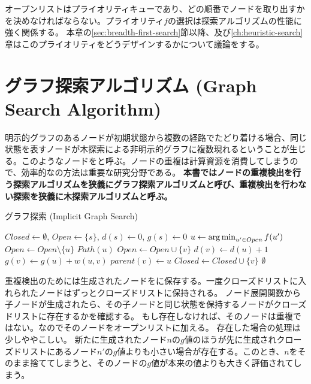 オープンリストはプライオリティキューであり、どの順番でノードを取り出すかを決めなければならない。プライオリティ$f$の選択は探索アルゴリズムの性能に強く関係する。
本章の\ref{sec:breadth-first-search}節以降、及び\ref{ch:heuristic-search}章はこのプライオリティをどうデザインするかについて議論をする。



\section{グラフ探索アルゴリズム (Graph Search Algorithm)}
\label{sec:graph-search-algorithm}


明示的グラフのあるノードが初期状態から複数の経路でたどり着ける場合、同じ状態を表すノードが木探索による非明示的グラフに複数現れるということが生じる。このようなノードをと呼ぶ。ノードの重複は計算資源を消費してしまうので、効率的なの方法は重要な研究分野である。
{\bf 本書ではノードの重複検出を行う探索アルゴリズムを狭義にグラフ探索アルゴリズムと呼び、重複検出を行わない探索を狭義に木探索アルゴリズムと呼ぶ。}


\begin{algorithm}[tbh]
\caption{グラフ探索 (Implicit Graph Search)}
\label{alg:implicit-graph-search}
	$Closed \leftarrow \emptyset$, $Open \leftarrow \{s\}$, $d(s) \leftarrow 0$, $g(s) \leftarrow 0$\;
	 {
                $u \leftarrow \operatorname*{arg\,min}_{u' \in Open} f(u')$ \;
		$Open \leftarrow Open \setminus \{u\} $\;
		 {
			\Return $Path(u)$\;
		}
		 {
		   {
                    $Open \leftarrow Open \cup \{v\}$\;
		    $d(v) \leftarrow d(u) + 1$\;
		    $g(v) \leftarrow g(u) + w(u, v)$\;
                    $parent(v) \leftarrow u$\;
                  }
		   {
                    $Closed \leftarrow Closed \cup \{v\}$\;
                  }
		}
 	}
	\Return $\emptyset$\;
\end{algorithm}


重複検出のためには生成されたノードをに保存する。一度クローズドリストに入れられたノードはずっとクローズドリストに保持される。
ノード展開関数から子ノードが生成されたら、その子ノードと同じ状態を保持するノードがクローズドリストに存在するかを確認する。
もし存在しなければ、そのノードは重複ではない。なのでそのノードをオープンリストに加える。
存在した場合の処理は少しややこしい。
新たに生成されたノード$n$の$g$値のほうが先に生成されクローズドリストにあるノード$n'$の$g$値よりも小さい場合が存在する。このとき、$n$をそのまま捨ててしまうと、そのノードの$g$値が本来の値よりも大きく評価されてしまう。

